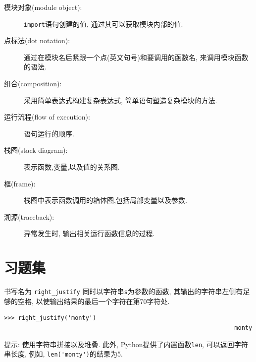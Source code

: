 \documentclass[10pt]{book}
\begin{document}
\begin{description}
\item[模块对象(module object):]  {\tt import}语句创建的值, 通过其可以获取模块内部的值. 

\item[点标法(dot notation):]  通过在模块名后紧跟一个点(英文句号)和要调用的函数名, 
来调用模块函数的语法. 

\item[组合(composition):] 采用简单表达式构建复杂表达式, 简单语句塑造复杂模块的方法. 

\item[运行流程(flow of execution):] 语句运行的顺序.

\item[栈图(stack diagram):]  表示函数,变量,以及值的关系图. 

\item[框(frame):]  栈图中表示函数调用的箱体图,包括局部变量以及参数. 

\item[溯源(traceback):] 异常发生时, 输出相关运行函数信息的过程. 


\end{description}


\section{习题集}

\begin{exercise}

书写名为 \verb"right_justify" 同时以字符串{\tt s}为参数的函数, 
其输出的字符串左侧有足够的空格, 以使输出结果的最后一个字符在第70字符处. 

\begin{verbatim}
>>> right_justify('monty')
                                                                 monty
\end{verbatim}

提示: 使用字符串拼接以及堆叠. 此外, Python提供了内置函数{\tt len}, 可以返回字符串长度, 
例如, \verb"len('monty')"的结果为5.

\end{exercise}
\end{document}
